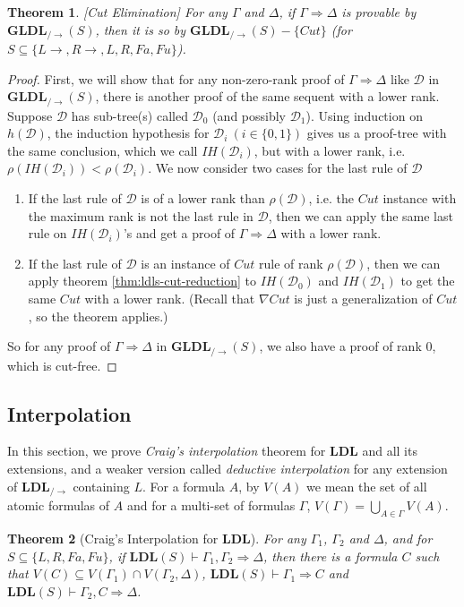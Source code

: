 \documentclass[12pt,a4paper]{article}
\theoremstyle{plain}
\newtheorem{thm}{Theorem}[section]
\theoremstyle{definition}
\begin{document}
\begin{thm}\label{thm:ldls-cut-elim}[Cut Elimination]
	For any $\Gamma$ and $\Delta$, if $\Gamma \Rightarrow \Delta$ is provable by $\mathbf{GLDL}_{/\rightarrow}(S)$, then it is so by $\mathbf{GLDL}_{/\rightarrow}(S)-\{Cut\}$ (for $S \subseteq \{L\rightarrow, R\rightarrow, L, R, Fa, Fu\}$).
\end{thm}
\begin{proof}
		First, we will show that for any non-zero-rank proof of $\Gamma \Rightarrow \Delta$ like $\mathcal{D}$ in $\mathbf{GLDL}_{/\rightarrow}(S)$, there is another proof of the same sequent with a lower rank. Suppose $\mathcal{D}$ has sub-tree(s) called $\mathcal{D}_0$ (and possibly $\mathcal{D}_1$). Using induction on $h(\mathcal{D})$, the induction hypothesis for $\mathcal{D}_i ~(i \in \{0,1\})$ gives us a proof-tree with the same conclusion, which we call $IH(\mathcal{D}_i)$, but with a lower rank, i.e. $\rho(IH(\mathcal{D}_i)) < \rho(\mathcal{D}_i)$. We now consider two cases for the last rule of $\mathcal{D}$

	\begin{enumerate}[label=\Roman*]
		\item If the last rule of $\mathcal{D}$ is of a lower rank than $\rho(\mathcal{D})$, i.e. the $Cut$ instance with the maximum rank is not the last rule in $\mathcal{D}$, then we can apply the same last rule on $IH(\mathcal{D}_i)$'s and get a proof of $\Gamma \Rightarrow \Delta$ with a lower rank.
		
		\item If the last rule of $\mathcal{D}$ is an instance of $Cut$ rule of rank $\rho(\mathcal{D})$, then we can apply theorem \ref{thm:ldls-cut-reduction} to $IH(\mathcal{D}_0)$ and $IH(\mathcal{D}_1)$ to get the same $Cut$ with a lower rank. (Recall that $\nabla Cut$ is just a generalization of $Cut$, so the theorem applies.)
	\end{enumerate}
	So for any proof of $\Gamma \Rightarrow \Delta$ in $\mathbf{GLDL}_{/\rightarrow}(S)$, we also have a proof of rank $0$, which is cut-free.
\end{proof}

\subsection{Interpolation}
In this section, we prove \emph{Craig's interpolation} theorem for $\mathbf{LDL}$ and all its extensions, and a weaker version called \emph{deductive interpolation} for any extension of $\mathbf{LDL}_{/\rightarrow}$ containing $L$. For a formula $A$, by $V(A)$ we mean the set of all atomic formulas of $A$ and for a multi-set of formulas $\Gamma$, $V(\Gamma) = \bigcup_{A \in \Gamma} V(A)$.
\begin{thm}[Craig's Interpolation for $\mathbf{LDL}$]\label{thm:ldl-craig} For any $\Gamma_1$, $\Gamma_2$ and $\Delta$, and for $S \subseteq \{L, R, Fa, Fu\}$, if $\mathbf{LDL}(S) \vdash \Gamma_1 , \Gamma_2 \Rightarrow \Delta$, then there is a formula $C$ such that $V(C) \subseteq V(\Gamma_1) \cap V(\Gamma_2 , \Delta)$, $\mathbf{LDL}(S) \vdash \Gamma_1 \Rightarrow C$ and $\mathbf{LDL}(S) \vdash \Gamma_2 , C \Rightarrow \Delta$.
\end{thm}
\end{document}
